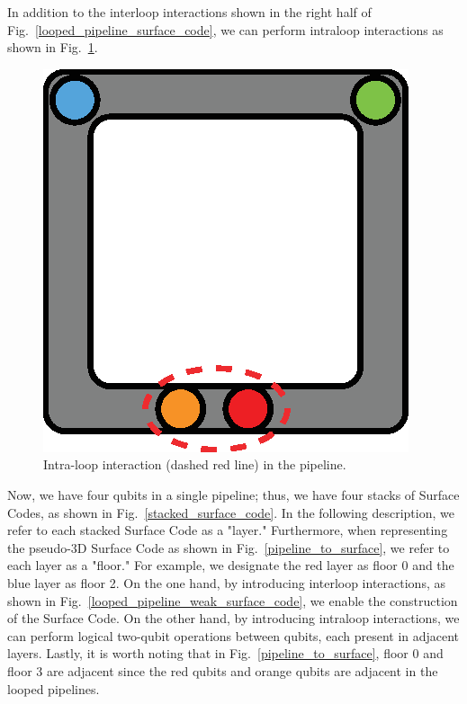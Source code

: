\documentclass[a4paper,11pt]{ltjsarticle}
\begin{document}
{{        In addition to the interloop interactions shown in the right half of Fig.~\ref{looped_pipeline_surface_code}, we can perform intraloop interactions as shown in Fig.~\ref{intraloop_interaction}.

        \begin{figure}[h]
            \centering
            \includegraphics[scale=0.50]{figure/intraloop_interaction.eps}
            \vspace{0pt}\caption{Intra-loop interaction (dashed red line) in the pipeline.}
            \label{intraloop_interaction}
            \vspace{-10pt}
        \end{figure}

        Now, we have four qubits in a single pipeline; thus, we have four stacks of Surface Codes, as shown in Fig.~\ref{stacked_surface_code}. In the following description, we refer to each stacked Surface Code as a "layer." Furthermore, when representing the pseudo-3D Surface Code as shown in Fig.~\ref{pipeline_to_surface}, we refer to each layer as a "floor." For example, we designate the red layer as floor 0 and the blue layer as floor 2. On the one hand, by introducing interloop interactions, as shown in Fig.~\ref{looped_pipeline_weak_surface_code}, we enable the construction of the Surface Code. On the other hand, by introducing intraloop interactions, we can perform logical two-qubit operations between qubits, each present in adjacent layers. Lastly, it is worth noting that in Fig.~\ref{pipeline_to_surface}, floor 0 and floor 3 are adjacent since the red qubits and orange qubits are adjacent in the looped pipelines.

}}
\end{document}

